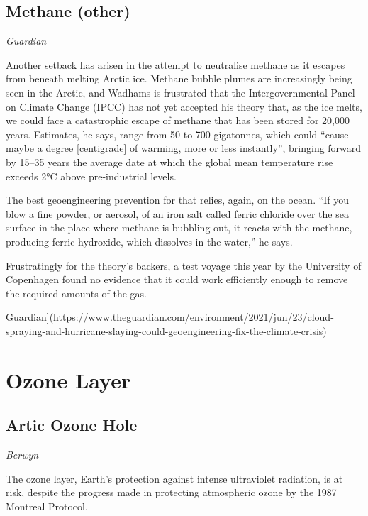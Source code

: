 \documentclass[
]{book}
\begin{document}
\hypertarget{methane-other}{%
\subsection{Methane (other)}\label{methane-other}}

\emph{Guardian}

Another setback has arisen in the attempt to neutralise methane as it escapes from beneath melting Arctic ice. Methane bubble plumes are increasingly being seen in the Arctic, and Wadhams is frustrated that the Intergovernmental Panel on Climate Change (IPCC) has not yet accepted his theory that, as the ice melts, we could face a catastrophic escape of methane that has been stored for 20,000 years. Estimates, he says, range from 50 to 700 gigatonnes, which could ``cause maybe a degree {[}centigrade{]} of warming, more or less instantly'', bringing forward by 15--35 years the average date at which the global mean temperature rise exceeds 2°C above pre-industrial levels.

The best geoengineering prevention for that relies, again, on the ocean. ``If you blow a fine powder, or aerosol, of an iron salt called ferric chloride over the sea surface in the place where methane is bubbling out, it reacts with the methane, producing ferric hydroxide, which dissolves in the water,'' he says.

Frustratingly for the theory's backers, a test voyage this year by the University of Copenhagen found no evidence that it could work efficiently enough to remove the required amounts of the gas.

Guardian{]}(\url{https://www.theguardian.com/environment/2021/jun/23/cloud-spraying-and-hurricane-slaying-could-geoengineering-fix-the-climate-crisis})

\hypertarget{ozone-layer}{%
\section{Ozone Layer}\label{ozone-layer}}

\hypertarget{artic-ozone-hole}{%
\subsection{Artic Ozone Hole}\label{artic-ozone-hole}}

\emph{Berwyn}

The ozone layer, Earth's protection against intense ultraviolet radiation, is at risk, despite the progress made in protecting atmospheric ozone by the 1987 Montreal Protocol.
\end{document}
